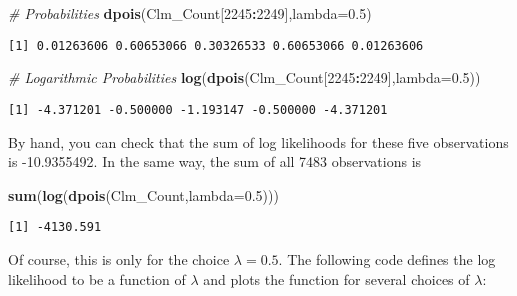 \documentclass[]{book}
\newenvironment{Shaded}{\begin{snugshade}}{\end{snugshade}}
\newcommand{\KeywordTok}[1]{\textcolor[rgb]{0.13,0.29,0.53}{\textbf{#1}}}
\newcommand{\DataTypeTok}[1]{\textcolor[rgb]{0.13,0.29,0.53}{#1}}
\newcommand{\DecValTok}[1]{\textcolor[rgb]{0.00,0.00,0.81}{#1}}
\newcommand{\FloatTok}[1]{\textcolor[rgb]{0.00,0.00,0.81}{#1}}
\newcommand{\CommentTok}[1]{\textcolor[rgb]{0.56,0.35,0.01}{\textit{#1}}}
\newcommand{\OperatorTok}[1]{\textcolor[rgb]{0.81,0.36,0.00}{\textbf{#1}}}
\newcommand{\NormalTok}[1]{#1}
\theoremstyle{definition}
\theoremstyle{definition}
\theoremstyle{definition}
\theoremstyle{remark}
\begin{document}
\begin{Shaded}
\begin{Highlighting}[]
\CommentTok{# Probabilities}
\KeywordTok{dpois}\NormalTok{(Clm_Count[}\DecValTok{2245}\OperatorTok{:}\DecValTok{2249}\NormalTok{],}\DataTypeTok{lambda=}\FloatTok{0.5}\NormalTok{)}
\end{Highlighting}
\end{Shaded}

\begin{verbatim}
[1] 0.01263606 0.60653066 0.30326533 0.60653066 0.01263606
\end{verbatim}

\begin{Shaded}
\begin{Highlighting}[]
\CommentTok{# Logarithmic Probabilities}
\KeywordTok{log}\NormalTok{(}\KeywordTok{dpois}\NormalTok{(Clm_Count[}\DecValTok{2245}\OperatorTok{:}\DecValTok{2249}\NormalTok{],}\DataTypeTok{lambda=}\FloatTok{0.5}\NormalTok{))}
\end{Highlighting}
\end{Shaded}

\begin{verbatim}
[1] -4.371201 -0.500000 -1.193147 -0.500000 -4.371201
\end{verbatim}

By hand, you can check that the sum of log likelihoods for these five
observations is -10.9355492. In the same way, the sum of all 7483
observations is

\begin{Shaded}
\begin{Highlighting}[]
\KeywordTok{sum}\NormalTok{(}\KeywordTok{log}\NormalTok{(}\KeywordTok{dpois}\NormalTok{(Clm_Count,}\DataTypeTok{lambda=}\FloatTok{0.5}\NormalTok{)))}
\end{Highlighting}
\end{Shaded}

\begin{verbatim}
[1] -4130.591
\end{verbatim}

Of course, this is only for the choice \(\lambda = 0.5\). The following
code defines the log likelihood to be a function of \(\lambda\) and
plots the function for several choices of \(\lambda\):
\end{document}
